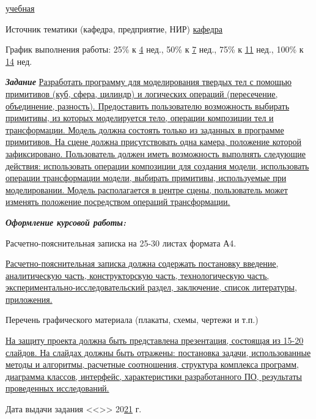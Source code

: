 \uline{\hfill учебная \hfill}

Источник тематики (кафедра, предприятие, НИР) \uline{\hfill кафедра \hfill}

График выполнения работы:  25\% к \uline{4} нед., 50\% к \uline{7} нед., 75\% к \uline{11} нед., 100\% к \uline{14} нед.

\textbf{\textit{Задание}}
\uline{Разработать программу для моделирования твердых тел с помощью примитивов (куб, сфера, цилиндр) и логических операций (пересечение, объединение, разность). 
Предоставить пользователю возможность выбирать примитивы, из которых моделируется тело, операции композиции тел и трансформации. 
Модель должна состоять только из заданных в программе примитивов.
На сцене должна присутствовать одна камера, положение которой зафиксировано.
Пользователь должен иметь возможность выполнять следующие действия: 
использовать операции композиции для создания модели,
использовать операции трансформации модели,
выбирать примитивы, используемые при моделировании.
Модель располагается в центре сцены, пользователь может изменять положение посредством операций трансформации.
    \hfill}

\textbf{\textit{Оформление курсовой работы:}}

Расчетно-пояснительная записка на 25-30  листах формата А4.

\uline{Расчетно-пояснительная записка должна содержать постановку введение, аналитическую часть, конструкторскую часть, технологическую часть, экспериментально-исследовательский раздел, заключение, список литературы, приложения.
    \hfill}

Перечень графического материала (плакаты, схемы, чертежи и т.п.)

\uline{На защиту проекта должна быть представлена презентация, состоящая из 15-20 слайдов. На слайдах должны быть отражены: постановка задачи, использованные методы и алгоритмы, расчетные соотношения, структура комплекса программ, диаграмма классов, интерфейс, характеристики разработанного ПО, результаты проведенных исследований.
    \hfill}

Дата выдачи задания
 <<\uline{\mbox{\hspace*{5mm}}}>> \uline{\mbox{\hspace*{2.5cm}}} 20\uline{21} г.

\endgroup


